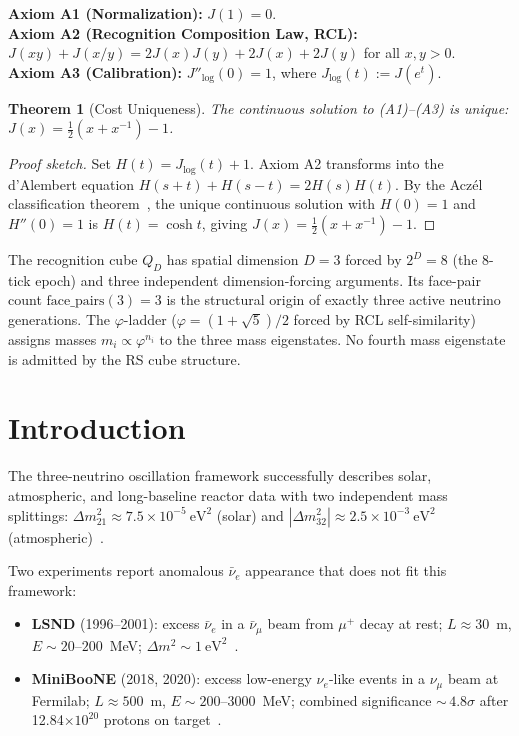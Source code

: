 \documentclass[12pt,a4paper]{article}
\newtheorem{theorem}{Theorem}[section]
\theoremstyle{definition}
\theoremstyle{remark}
\begin{document}
\noindent\textbf{Axiom A1 (Normalization):} $J(1) = 0$.\\
\textbf{Axiom A2 (Recognition Composition Law, RCL):}
$J(xy)+J(x/y)=2J(x)J(y)+2J(x)+2J(y)$ for all $x,y>0$.\\
\textbf{Axiom A3 (Calibration):} $J''_{\log}(0) = 1$, where
$J_{\log}(t) := J(e^t)$.

\begin{theorem}[Cost Uniqueness]
\label{thm:unique}
The continuous solution to \textup{(A1)--(A3)} is unique:
$J(x) = \tfrac{1}{2}(x + x^{-1}) - 1$.
\end{theorem}

\begin{proof}[Proof sketch]
Set $H(t) = J_{\log}(t)+1$.  Axiom A2 transforms into the d'Alembert
equation $H(s+t)+H(s-t)=2H(s)H(t)$.  By the Acz\'el classification
theorem~\cite{Aczel1966}, the unique continuous solution with $H(0)=1$
and $H''(0)=1$ is $H(t)=\cosh t$, giving
$J(x)=\tfrac{1}{2}(x+x^{-1})-1$.
\end{proof}

\noindent The recognition cube $Q_D$ has spatial dimension $D=3$ forced
by $2^D=8$ (the 8-tick epoch) and three independent dimension-forcing
arguments.  Its face-pair count $\mathrm{face\_pairs}(3)=3$ is the
structural origin of exactly three active neutrino generations.  The
$\varphi$-ladder ($\varphi=(1+\sqrt{5})/2$ forced by RCL self-similarity)
assigns masses $m_i \propto \varphi^{n_i}$ to the three mass eigenstates.
No fourth mass eigenstate is admitted by the RS cube structure.

\section{Introduction}
\label{sec:intro}

The three-neutrino oscillation framework successfully describes solar,
atmospheric, and long-baseline reactor data with two independent mass
splittings: $\Delta m^2_{21} \approx 7.5 \times 10^{-5}~\mathrm{eV}^2$
(solar) and $|\Delta m^2_{32}| \approx 2.5 \times 10^{-3}~\mathrm{eV}^2$
(atmospheric)~\cite{PDG}.

Two experiments report anomalous $\bar{\nu}_e$ appearance that does
not fit this framework:
\begin{itemize}[nosep]
  \item \textbf{LSND} (1996--2001): excess $\bar{\nu}_e$ in a
  $\bar{\nu}_\mu$ beam from $\mu^+$ decay at rest; $L \approx 30$~m,
  $E \sim 20$--$200$~MeV; $\Delta m^2 \sim
  1~\mathrm{eV}^2$~\cite{LSND}.
  \item \textbf{MiniBooNE} (2018, 2020): excess low-energy $\nu_e$-like
  events in a $\nu_\mu$ beam at Fermilab; $L \approx 500$~m,
  $E \sim 200$--$3000$~MeV; combined significance ${\sim}\,4.8\sigma$
  after 12.84$\times 10^{20}$ protons on target~\cite{MiniBooNE2020}.
\end{itemize}
\end{document}
